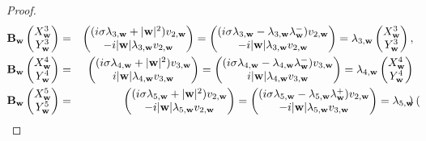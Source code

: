 \documentclass[10pt,reqno]{amsart}
\renewcommand{\(}{\left(}
\renewcommand{\)}{\right)}
\newcommand{\bw}{{\bf w}}
\newcommand{\BB}{{\bf B}}
\numberwithin{equation}{section}
\begin{document}
\begin{proof}
\begin{eqnarray*}
		\BB_{\bw} \begin{pmatrix}
			X^3_{\bw}  \\
			Y^3_{\bw}
		\end{pmatrix} &=&  \begin{pmatrix}
			(i\sigma \lambda_{3,\bw} + |\bw|^2 )  v_{2,\bw} \\
			-i|\bw| \lambda_{3,\bw} v_{2,\bw} 
		\end{pmatrix} = \begin{pmatrix}
			(i\sigma \lambda_{3,\bw} - \lambda_{3,\bw}{\lambda}^-_{\bw} )  v_{2,\bw} \\
			-i|\bw| \lambda_{3,\bw} v_{2,\bw} 
		\end{pmatrix} =  \lambda_{3,\bw}\begin{pmatrix}
			X^3_{\bw}  \\
			Y^3_{\bw}
		\end{pmatrix}, \\
		\BB_{\bw} \begin{pmatrix}
			X^4_{\bw}  \\
			Y^4_{\bw}
		\end{pmatrix} &=&  \begin{pmatrix}
			(i\sigma \lambda_{4,\bw} + |\bw|^2 )  v_{3,\bw} \\
			i|\bw| \lambda_{4,\bw} v_{3,\bw} 
		\end{pmatrix} = \begin{pmatrix}
			(i\sigma \lambda_{4,\bw} - \lambda_{4,\bw}{\lambda}^-_{\bw} )  v_{3,\bw} \\
			i|\bw| \lambda_{4,\bw} v_{3,\bw} 
		\end{pmatrix} =  \lambda_{4,\bw}\begin{pmatrix}
			X^4_{\bw}  \\
			Y^4_{\bw}
		\end{pmatrix} \nonumber\\
		\BB_{\bw} \begin{pmatrix}
			X^5_{\bw}  \\
			Y^5_{\bw}
		\end{pmatrix} &=&  \begin{pmatrix}
			(i\sigma \lambda_{5,\bw} + |\bw|^2 )  v_{2,\bw} \\
			-i|\bw| \lambda_{5,\bw} v_{2,\bw} 
		\end{pmatrix} = \begin{pmatrix}
			(i\sigma \lambda_{5,\bw} - \lambda_{5,\bw}\lambda^+_{\bw} )  v_{2,\bw} \\
			-i|\bw| \lambda_{5,\bw} v_{3,\bw} 
		\end{pmatrix} =  \lambda_{5,\bw}\begin{pmatrix}

\end{pmatrix}
\end{eqnarray*}
\end{proof}
\end{document}
